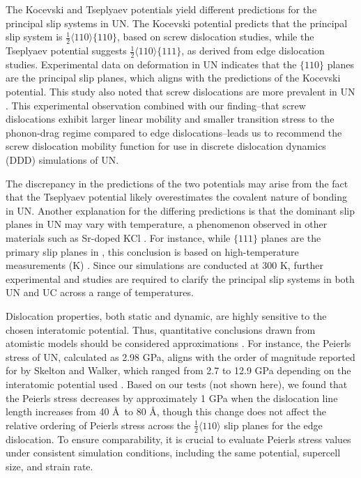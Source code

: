 \documentclass[applsci,article,submit,pdftex,moreauthors]{Definitions/mdpi}
\newcommand{\?}{\stackrel{?}{=}}
\providecommand{\DIFadd}[1]{{\bf #1}} %
\providecommand{\DIFdel}[1]{} %
\providecommand{\DIFaddbegin}{\protect\color{blue}} %
\providecommand{\DIFaddend}{\protect\color{black}} %
\providecommand{\DIFdelbegin}{\protect\color{red}} %
\providecommand{\DIFdelend}{\protect\color{black}} %
\newcommand{\DIFscaledelfig}{0.5}
\newlength{\DIFdelgraphicswidth} %
\newlength{\DIFdelgraphicsheight} %
\newcommand{\DIFaddincludegraphics}[2][]{{\color{blue}\fbox{\DIFOincludegraphics[#1]{#2}}}} %
\newcommand{\DIFdelincludegraphics}[2][]{%
\sbox{\DIFdelgraphicsbox}{\DIFOincludegraphics[#1]{#2}}%
\settoboxwidth{\DIFdelgraphicswidth}{\DIFdelgraphicsbox} %
\settoboxtotalheight{\DIFdelgraphicsheight}{\DIFdelgraphicsbox} %
\scalebox{\DIFscaledelfig}{%
\parbox[b]{\DIFdelgraphicswidth}{\usebox{\DIFdelgraphicsbox}\\[-\baselineskip] \rule{\DIFdelgraphicswidth}{0em}}\llap{\resizebox{\DIFdelgraphicswidth}{\DIFdelgraphicsheight}{%
\setlength{\unitlength}{\DIFdelgraphicswidth}%
\begin{picture}(1,1)%
\thicklines\linethickness{2pt} %
{\color[rgb]{1,0,0}\put(0,0){\framebox(1,1){}}}%
{\color[rgb]{1,0,0}\put(0,0){\line( 1,1){1}}}%
{\color[rgb]{1,0,0}\put(0,1){\line(1,-1){1}}}%
\end{picture}%
}\hspace*{3pt}}} %
} %
\DeclareRobustCommand{\DIFaddbegin}{\DIFOaddbegin \let\includegraphics\DIFaddincludegraphics} %
\DeclareRobustCommand{\DIFaddend}{\DIFOaddend \let\includegraphics\DIFOincludegraphics} %
\DeclareRobustCommand{\DIFdelbegin}{\DIFOdelbegin \let\includegraphics\DIFdelincludegraphics} %
\DeclareRobustCommand{\DIFdelend}{\DIFOaddend \let\includegraphics\DIFOincludegraphics} %
\begin{document}
The Kocevski and Tseplyaev potentials yield different predictions for the principal slip systems in UN. The Kocevski potential predicts that the principal slip system is $\frac{1}{2} \langle 110 \rangle \{110\}$, based on screw dislocation studies, while the Tseplyaev potential suggests $\frac{1}{2} \langle 110 \rangle \{111\}$, as derived from edge dislocation studies. Experimental data \cite{Sole1968} on deformation in UN indicates that the $\{110\}$ planes are the principal slip planes, which aligns with the predictions of the Kocevski potential. This study also noted that screw dislocations are more prevalent in UN \cite{Sole1968}. This experimental observation combined with our finding--that screw dislocations exhibit larger linear mobility and smaller transition stress to the phonon-drag regime compared to edge dislocations--leads us to recommend the screw dislocation mobility function for use in discrete dislocation dynamics (DDD) simulations of UN.

The discrepancy in the predictions of the two potentials may arise from the fact that the Tseplyaev potential likely overestimates the covalent nature of bonding in UN. Another explanation for the differing predictions is that the dominant slip planes in UN may vary with temperature, a phenomenon observed in other materials such as Sr-doped KCl \cite{Haasen1985}. For instance, while $\{111\}$ planes are the primary slip planes in \DIFdelbegin \DIFdel{uranium carbide (UC)}\DIFdelend \DIFaddbegin \DIFadd{UC}\DIFaddend , this conclusion is based on high-temperature measurements (\DIFdelbegin \DIFdel{1680–2200 }\DIFdelend \DIFaddbegin \DIFadd{1680--2200 }\DIFaddend K) \cite{Vasudevamurthy2022}. Since our simulations are conducted at 300 K, further experimental and \DIFdelbegin \DIFdel{density functional theory (DFT ) }\DIFdelend \DIFaddbegin \DIFadd{DFT }\DIFaddend studies are required to clarify the principal slip systems in both UN and UC across a range of temperatures.

Dislocation properties, both static and dynamic, are highly sensitive to the chosen interatomic potential. Thus, quantitative conclusions drawn from atomistic models should be considered approximations \cite{Puls1976, Liu2012}. For instance, the Peierls stress of UN, calculated as 2.98 GPa, aligns with the order of magnitude reported for  by Skelton and Walker, which ranged from 2.7 to 12.9 GPa depending on the interatomic potential used \cite{Skelton2017}. Based on our tests (not shown here), we found that the Peierls stress decreases by approximately 1 GPa when the dislocation line length increases from 40 \AA\ to 80 \AA, though this change does not affect the relative ordering of Peierls stress across the $\frac{1}{2}\langle110\rangle$ slip planes for the edge dislocation. To ensure comparability, it is crucial to evaluate Peierls stress values under consistent simulation conditions, including the same potential, supercell size, and strain rate.
\end{document}
